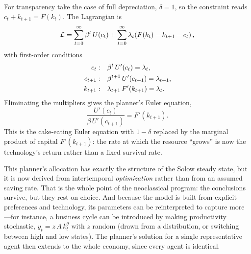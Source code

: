 For transparency take the case of full depreciation, $\delta = 1$, so the constraint reads $c_t + k_{t+1} = F(k_t)$. The Lagrangian is
\[
\mathcal{L} = \sum_{t=0}^{\infty} \beta^t\, U(c_t) + \sum_{t=0}^{\infty} \lambda_t\!\left(F(k_t) - k_{t+1} - c_t\right),
\]
with first-order conditions
\[
\begin{aligned}
c_t:&\quad \beta^t\, U'(c_t) = \lambda_t, \\
c_{t+1}:&\quad \beta^{t+1}\, U'(c_{t+1}) = \lambda_{t+1}, \\
k_{t+1}:&\quad \lambda_{t+1}\, F'(k_{t+1}) = \lambda_t.
\end{aligned}
\]
Eliminating the multipliers gives the planner's Euler equation,
\[
\frac{U'(c_t)}{\beta\, U'(c_{t+1})} = F'(k_{t+1}).
\]
This is the cake-eating Euler equation with $1-\delta$ replaced by the marginal product of capital $F'(k_{t+1})$: the rate at which the resource ``grows'' is now the technology's return rather than a fixed survival rate.


This planner's allocation has exactly the structure of the Solow steady state, but it is now derived from intertemporal \emph{optimization} rather than from an assumed saving rate. That is the whole point of the neoclassical program: the conclusions survive, but they rest on choice. And because the model is built from explicit preferences and technology, its parameters can be reinterpreted to capture more---for instance, a business cycle can be introduced by making productivity stochastic, $y_t = z\, A\, k_t^{\theta}$ with $z$ random (drawn from a distribution, or switching between high and low states). The planner's solution for a single representative agent then extends to the whole economy, since every agent is identical.

